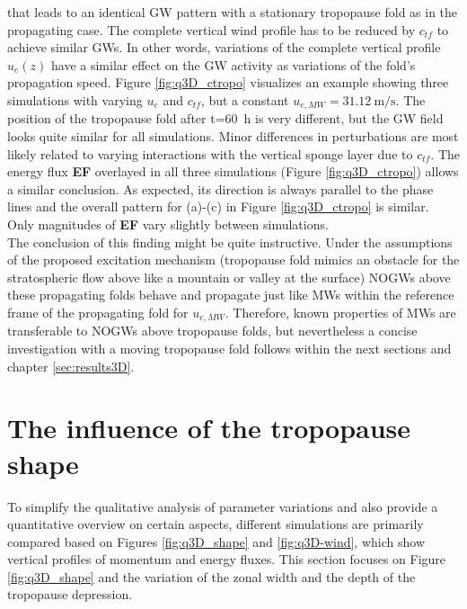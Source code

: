 that leads to an identical GW pattern with a stationary tropopause fold as in the propagating case. The complete vertical wind profile has to be reduced by $c_{tf}$ to achieve similar GWs. In other words, variations of the complete vertical profile $u_e(z)$ have a similar effect on the GW activity as variations of the fold's propagation speed. Figure \ref{fig:q3D_ctropo} visualizes an example showing three simulations with varying $u_e$ and $c_{tf}$, but a constant $u_{e,MW}=\SI{31.12}{\meter\per\second}$. The position of the tropopause fold after t=\SI{60}{\hour} is very different, but the GW field looks quite similar for all simulations. Minor differences in perturbations are most likely related to varying interactions with the vertical sponge layer due to $c_{tf}$. The energy flux \textbf{EF} overlayed in all three simulations (Figure \ref{fig:q3D_ctropo}) allows a similar conclusion. As expected, its direction is always parallel to the phase lines and the overall pattern for (a)-(c) in Figure \ref{fig:q3D_ctropo} is similar. Only magnitudes of \textbf{EF} vary slightly between simulations. \\
The conclusion of this finding might be quite instructive. Under the assumptions of the proposed excitation mechanism (tropopause fold mimics an obstacle for the stratospheric flow above like a mountain or valley at the surface) NOGWs above these propagating folds behave and propagate just like MWs within the reference frame of the propagating fold for $u_{e,MW}$. Therefore, known properties of MWs are transferable to NOGWs above tropopause folds, but nevertheless a concise investigation with a moving tropopause fold follows within the next sections and chapter \ref{sec:results3D}.
%
\section{The influence of the tropopause shape}
\label{sec:q3D-shape}
To simplify the qualitative analysis of parameter variations and also provide a quantitative overview on certain aspects, different simulations are primarily compared based on Figures \ref{fig:q3D_shape} and \ref{fig:q3D-wind}, which show vertical profiles of momentum and energy fluxes. This section focuses on Figure \ref{fig:q3D_shape} and the variation of the zonal width and the depth of the tropopause depression.


